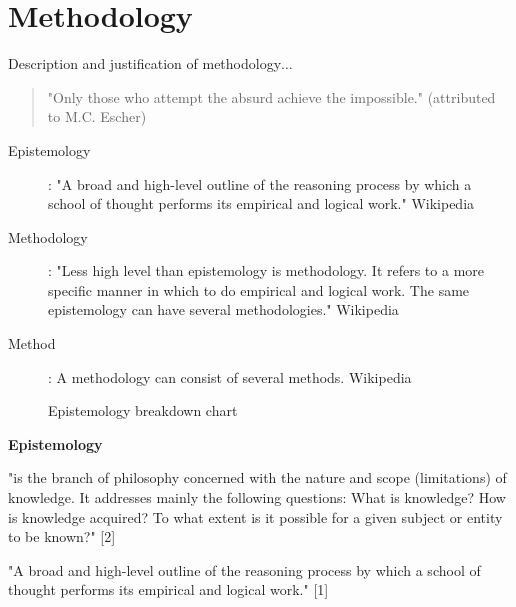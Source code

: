 
\chapter{Methodology}
\label{ch:method}

\begin{shaded}
  Description and justification of methodology$\ldots$
\end{shaded}

\begin{quote}
  "Only those who attempt the absurd achieve the impossible." (attributed to M.C. Escher)
\end{quote}

\begin{description}
  \item [Epistemology]:	"A broad and high-level outline of the reasoning process by which a school of thought performs its empirical and logical work." Wikipedia
  \item [Methodology]: "Less high level than epistemology is methodology. It refers to a more specific manner in which to do empirical and logical work. The same epistemology can have several methodologies." Wikipedia
  \item [Method]:	A methodology can consist of several methods. Wikipedia
\end{description}

\begin{figure}[htb]
  \centering
  \caption[Epistemology]{Epistemology breakdown chart}
  \label{fig:method}
\end{figure}

\textbf{Epistemology}

"is the branch of philosophy concerned with the nature and scope (limitations) of knowledge. It addresses mainly the following questions: What is knowledge? How is knowledge acquired? To what extent is it possible for a given subject or entity to be known?" [2]

"A broad and high-level outline of the reasoning process by which a school of thought performs its empirical and logical work." [1]

